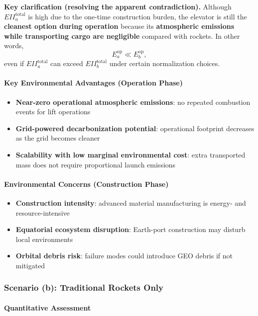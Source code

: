 \documentclass{mcmthesis}
\begin{document}
\noindent\textbf{Key clarification (resolving the apparent contradiction).}
Although $EII_a^{\text{total}}$ is high due to the one-time construction burden, the elevator is still the \textbf{cleanest option during operation} because its \textbf{atmospheric emissions while transporting cargo are negligible} compared with rockets. In other words,
\[
    E_a^{\text{op}} \ll E_b^{\text{op}},
\]
even if $EII_a^{\text{total}}$ can exceed $EII_b^{\text{total}}$ under certain normalization choices.

\paragraph{Key Environmental Advantages (Operation Phase)}
\begin{itemize}
    \item \textbf{Near-zero operational atmospheric emissions}: no repeated combustion events for lift operations
    \item \textbf{Grid-powered decarbonization potential}: operational footprint decreases as the grid becomes cleaner
    \item \textbf{Scalability with low marginal environmental cost}: extra transported mass does not require proportional launch emissions
\end{itemize}

\paragraph{Environmental Concerns (Construction Phase)}
\begin{itemize}
    \item \textbf{Construction intensity}: advanced material manufacturing is energy- and resource-intensive
    \item \textbf{Equatorial ecosystem disruption}: Earth-port construction may disturb local environments
    \item \textbf{Orbital debris risk}: failure modes could introduce GEO debris if not mitigated
\end{itemize}

\subsubsection{Scenario (b): Traditional Rockets Only}

\paragraph{Quantitative Assessment}
\end{document}
